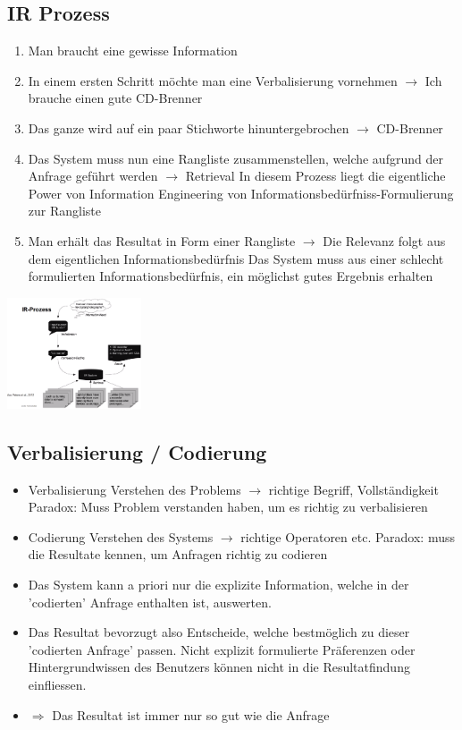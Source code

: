 \documentclass{report}
\newenvironment{Figure}
	{\par\medskip\noindent\minipage{\linewidth}}
	{\endminipage\par\medskip}
\theoremstyle{definition}
\theoremstyle{example}
\begin{document}
\subsection{IR Prozess}

\begin{enumerate}
   \item Man braucht eine gewisse Information
   \item In einem ersten Schritt möchte man eine Verbalisierung vornehmen $\rightarrow$ Ich brauche einen gute CD-Brenner
   \item Das ganze wird auf ein paar Stichworte hinuntergebrochen $\rightarrow$ CD-Brenner
   \item Das System muss nun eine Rangliste zusammenstellen, welche aufgrund der Anfrage geführt werden $\rightarrow$ Retrieval
   \subitem In diesem Prozess liegt die eigentliche Power von Information Engineering von Informationsbedürfniss-Formulierung zur Rangliste 
   \item Man erhält das Resultat in Form einer Rangliste $\rightarrow$ Die Relevanz folgt aus dem eigentlichen Informationsbedürfnis 
   \subitem Das System muss aus einer schlecht formulierten Informationsbedürfnis, ein möglichst gutes Ergebnis erhalten  
\end{enumerate}

\begin{Figure}
   \centering
    \includegraphics[width=150px]{img/IRProzess.png}
        \label{fig:IR Process}
\end{Figure}

\subsection{Verbalisierung / Codierung}
\begin{itemize}
   \item Verbalisierung Verstehen des Problems $\rightarrow$ richtige Begriff, Vollständigkeit
   \subitem Paradox: Muss Problem verstanden haben, um es richtig zu verbalisieren
   \item Codierung Verstehen des Systems $\rightarrow$ richtige Operatoren etc.
   \subitem Paradox: muss die Resultate kennen, um Anfragen richtig zu codieren 
   \item Das System kann a priori nur die explizite Information, welche in der 'codierten' Anfrage enthalten ist, auswerten.
   \item Das Resultat bevorzugt also Entscheide, welche bestmöglich zu dieser 'codierten Anfrage' passen. Nicht explizit formulierte Präferenzen oder Hintergrundwissen des
   Benutzers können nicht in die Resultatfindung einfliessen.
   \item $\Rightarrow$ Das Resultat ist immer nur so gut wie die Anfrage
\end{itemize}
\end{document}

